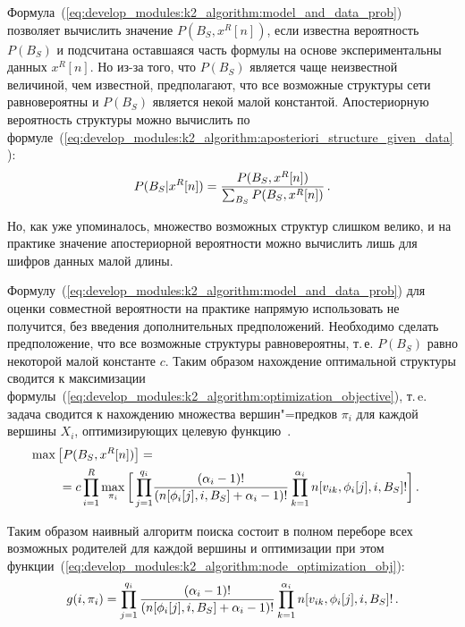Формула~(\ref{eq:develop_modules:k2_algorithm:model_and_data_prob}) позволяет вычислить значение $P(B_S, x^R[n])$, если известна вероятность $P(B_S)$ и подсчитана оставшаяся часть формулы на основе экспериментальны данных $x^R[n]$.
Но из-за того, что $P(B_S)$ является чаще неизвестной величиной, чем известной, предполагают, что все возможные структуры сети равновероятны и $P(B_S)$ является некой малой константой.
Апостериорную вероятность структуры можно вычислить по формуле~(\ref{eq:develop_modules:k2_algorithm:aposteriori_structure_given_data}):
\begin{equation}
  \label{eq:develop_modules:k2_algorithm:aposteriori_structure_given_data}
  P(B_S | x^R[n]) =
    \frac{P(B_S, x^R[n])}
         {\sum_{B_S}P(B_S, x^R[n])} \text{\,.}
\end{equation}

Но, как уже упоминалось, множество возможных структур слишком велико, и на практике значение апостериорной вероятности можно вычислить лишь для шифров данных малой длины.

Формулу~(\ref{eq:develop_modules:k2_algorithm:model_and_data_prob}) для оценки совместной вероятности на практике напрямую использовать не получится, без введения дополнительных предположений.
Необходимо сделать предположение, что все возможные структуры равновероятны, т.\,е. $P(B_S)$ равно некоторой малой константе $c$.
Таким образом нахождение оптимальной структуры сводится к максимизации формулы~(\ref{eq:develop_modules:k2_algorithm:optimization_objective}), т.\,e. задача сводится к нахождению множества вершин"=предков $ \pi_i $ для каждой вершины $X_i$, оптимизирующих целевую функцию~\cite{Cooper1991}.
\begin{align}
  \label{eq:develop_modules:k2_algorithm:optimization_objective}
  \max \left[ P(B_S, x^R[n]) \right] = \notag\\
  =
    c \prod_{i = 1}^{R} \max_{\pi_i}
    \bigg[
      \prod_{j = 1}^{q_i} &%
      \frac{(\alpha_i - 1)!}
           {(n[\phi_i[j], i, B_S] + \alpha_i - 1)!}
      \prod_{k = 1}^{\alpha_i}
        n[v_{ik}, \phi_i[j], i, B_S]!
    \bigg] \text{\,.}
\end{align}

Таким образом наивный алгоритм поиска состоит в полном переборе всех возможных родителей для каждой вершины и оптимизации при этом функции~(\ref{eq:develop_modules:k2_algorithm:node_optimization_obj}):
\begin{equation}
  \label{eq:develop_modules:k2_algorithm:node_optimization_obj}
  g(i, \pi_i) =
    \prod_{j = 1}^{q_i}
      \frac{(\alpha_i - 1)!}
           {(n[\phi_i[j], i, B_S] + \alpha_i - 1)!}
      \prod_{k = 1}^{\alpha_i}
        n[v_{ik}, \phi_i[j], i, B_S]! \text{\,.}
\end{equation}

